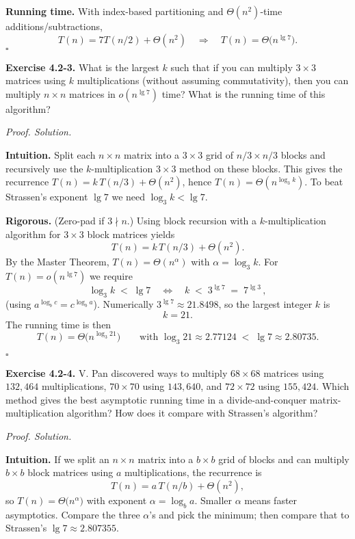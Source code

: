 \documentclass[12pt]{article}
\theoremstyle{definition}
\begin{document}
\noindent\textbf{Running time.}
With index-based partitioning and $\Theta(n^2)$-time additions/subtractions,
\[
T(n)=7T(n/2)+\Theta(n^2)\quad\Rightarrow\quad T(n)=\Theta\!\big(n^{\lg 7}\big).
\]
\hfill$\square$

\newpage

\noindent\textbf{Exercise 4.2-3.}
What is the largest $k$ such that if you can multiply $3\times 3$ matrices using $k$
multiplications (without assuming commutativity), then you can multiply $n\times n$
matrices in $o(n^{\lg 7})$ time? What is the running time of this algorithm?

\medskip
\noindent\textit{Proof. Solution.}

\noindent\textbf{Intuition.}
Split each $n\times n$ matrix into a $3\times 3$ grid of $n/3\times n/3$ blocks and
recursively use the $k$-multiplication $3\times 3$ method on these blocks.
This gives the recurrence $T(n)=k\,T(n/3)+\Theta(n^2)$, hence
$T(n)=\Theta(n^{\log_3 k})$. To beat Strassen’s exponent $\lg 7$ we need
$\log_3 k<\lg 7$.

\noindent\textbf{Rigorous.}
(Zero-pad if $3\nmid n$.) Using block recursion with a $k$-multiplication algorithm
for $3\times 3$ block matrices yields
\[
T(n)=k\,T(n/3)+\Theta(n^2).
\]
By the Master Theorem, $T(n)=\Theta(n^{\alpha})$ with $\alpha=\log_3 k$.
For $T(n)=o(n^{\lg 7})$ we require
\[
\log_3 k \;<\; \lg 7
\quad\Longleftrightarrow\quad
k \;<\; 3^{\lg 7} \;=\; 7^{\lg 3}\,,
\]
(using $a^{\log_b c}=c^{\log_b a}$).
Numerically $3^{\lg 7}\approx 21.8498$, so the largest integer $k$ is
\[
\boxed{k=21}.
\]
The running time is then
\[
\boxed{T(n)=\Theta\!\big(n^{\log_3 21}\big)}
\qquad\text{with }\log_3 21 \approx 2.77124 \;<\; \lg 7 \approx 2.80735.
\]

\hfill$\square$

\newpage

\noindent\textbf{Exercise 4.2-4.}
V. Pan discovered ways to multiply $68\times68$ matrices using $132{,}464$ multiplications,
$70\times70$ using $143{,}640$, and $72\times72$ using $155{,}424$.
Which method gives the best asymptotic running time in a divide-and-conquer
matrix-multiplication algorithm? How does it compare with Strassen’s algorithm?

\medskip
\noindent\textit{Proof. Solution.}

\noindent\textbf{Intuition.}
If we split an $n\times n$ matrix into a $b\times b$ grid of blocks and can multiply
$b\times b$ block matrices using $a$ multiplications, the recurrence is
\[
T(n)=a\,T(n/b)+\Theta(n^2),
\]
so $T(n)=\Theta\!\big(n^{\alpha}\big)$ with exponent $\alpha=\log_b a$.
Smaller $\alpha$ means faster asymptotics. Compare the three $\alpha$’s and pick
the minimum; then compare that to Strassen’s $\lg 7\approx 2.807355$.
\end{document}
